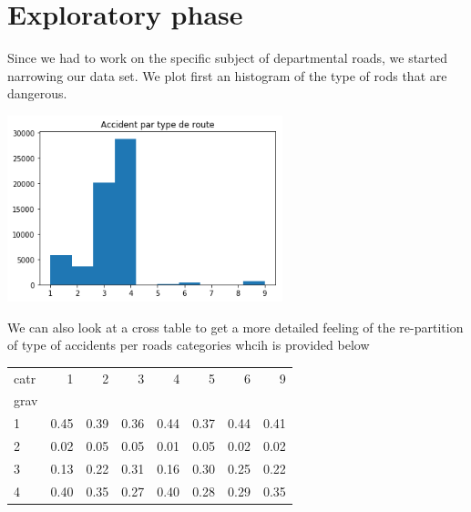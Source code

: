 \documentclass[a4paper]{article}
\theoremstyle{definition}
\theoremstyle{proposition}
\begin{document}
\section{Exploratory phase}
Since we had to work on the specific subject of departmental roads, we started narrowing our data set. We plot first an histogram of the type of rods that are dangerous. 

\includegraphics[width=8cm]{histo_roads_category.png}
\vspace{0.5cm}

We can also look at a cross table to get a more detailed feeling of the re-partition of type of accidents per roads categories whcih is provided below

\begin{tabular}{lrrrrrrr}
\toprule
catr &    1 &    2 &    3 &    4 &    5 &    6 &    9 \\
grav &      &      &      &      &      &      &      \\
\midrule
1    & 0.45 & 0.39 & 0.36 & 0.44 & 0.37 & 0.44 & 0.41 \\
2    & 0.02 & 0.05 & 0.05 & 0.01 & 0.05 & 0.02 & 0.02 \\
3    & 0.13 & 0.22 & 0.31 & 0.16 & 0.30 & 0.25 & 0.22 \\
4    & 0.40 & 0.35 & 0.27 & 0.40 & 0.28 & 0.29 & 0.35 \\
\bottomrule
\end{tabular}
 \label{cross_tab1}
\end{document}
